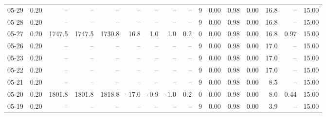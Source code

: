 \begin{threeparttable}
{\begin{tabular}{lrrrrrrrrrrrrrrr}
  05-29 &     0.20 &     -- &     -- &     -- &         -- &             -- &                       -- &                  -- &              9 &       0.00 &      0.98 &           0.00 &             16.8 &              -- &                  15.00 \\
  05-28 &     0.20 &     -- &     -- &     -- &         -- &             -- &                       -- &                  -- &              9 &       0.00 &      0.98 &           0.00 &             16.8 &              -- &                  15.00 \\
  05-27 &     0.20 & 1747.5 & 1747.5 & 1730.8 &       16.8 &            1.0 &                      1.0 &                 0.2 &              0 &       0.00 &      0.98 &           0.00 &             16.8 &            0.97 &                  15.00 \\
  05-26 &     0.20 &     -- &     -- &     -- &         -- &             -- &                       -- &                  -- &              9 &       0.00 &      0.98 &           0.00 &             17.0 &              -- &                  15.00 \\
  05-23 &     0.20 &     -- &     -- &     -- &         -- &             -- &                       -- &                  -- &              9 &       0.00 &      0.98 &           0.00 &             17.0 &              -- &                  15.00 \\
  05-22 &     0.20 &     -- &     -- &     -- &         -- &             -- &                       -- &                  -- &              9 &       0.00 &      0.98 &           0.00 &             17.0 &              -- &                  15.00 \\
  05-21 &     0.20 &     -- &     -- &     -- &         -- &             -- &                       -- &                  -- &              9 &       0.00 &      0.98 &           0.00 &              8.5 &              -- &                  15.00 \\
  05-20 &     0.20 & 1801.8 & 1801.8 & 1818.8 &      -17.0 &           -0.9 &                     -1.0 &                 0.2 &              0 &       0.00 &      0.98 &           0.00 &              8.0 &            0.44 &                  15.00 \\
  05-19 &     0.20 &     -- &     -- &     -- &         -- &             -- &                       -- &                  -- &              9 &       0.00 &      0.98 &           0.00 &              3.9 &              -- &                  15.00 \\

\end{tabular}}
\end{threeparttable}
